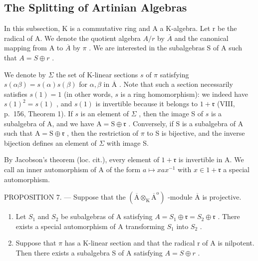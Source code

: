 \subsection{The Splitting of Artinian Algebras}

In this subsection, K is a commutative ring and A a K-algebra. Let r be the radical of A. We denote the quotient algebra \(A/r\) by \(\overline{A}\) and the canonical mapping from A to \(\overline{A}\) by \(\pi\) . We are interested in the subalgebras S of A such that \(A = S \oplus r\) .

We denote by \(\Sigma\) the set of K-linear sections \(s\) of \(\pi\) satisfying \(s(\alpha\beta) = s(\alpha)s(\beta)\) for \(\alpha, \beta\) in \(\overline{\mathrm{A}}\) . Note that such a section necessarily satisfies \(s(1) = 1\) (in other words, \(s\) is a ring homomorphism): we indeed have \(s(1)^2 = s(1)\) , and \(s(1)\) is invertible because it belongs to \(1 + \mathfrak{r}\) (VIII, p.~156, Theorem 1). If \(s\) is an element of \(\Sigma\) , then the image S of \(s\) is a subalgebra of A, and we have \(\mathrm{A} = \mathrm{S} \oplus \mathfrak{r}\) . Conversely, if S is a subalgebra of A such that \(\mathrm{A} = \mathrm{S} \oplus \mathfrak{r}\) , then the restriction of \(\pi\) to S is bijective, and the inverse bijection defines an element of \(\Sigma\) with image S.

By Jacobson's theorem (loc. cit.), every element of \(1 + \mathfrak{r}\) is invertible in A. We call an inner automorphism of A of the form \(a \mapsto xax^{-1}\) with \(x \in 1 + \mathfrak{r}\) a special automorphism.

PROPOSITION 7. --- Suppose that the \((\overline{\mathrm{A}}\otimes_{\mathrm{K}}\overline{\mathrm{A}}^{\mathrm{o}})\) -module \(\overline{\mathrm{A}}\) is projective.

\begin{enumerate}
\def\labelenumi{\alph{enumi})}
\item
  Let \(S_1\) and \(S_2\) be subalgebras of A satisfying \(A = S_1 \oplus \mathfrak{r} = S_2 \oplus \mathfrak{r}\) . There exists a special automorphism of A transforming \(S_1\) into \(S_2\) .
\item
  Suppose that \(\pi\) has a K-linear section and that the radical r of A is nilpotent. Then there exists a subalgebra S of A satisfying \(A = S \oplus r\) .
\end{enumerate}

